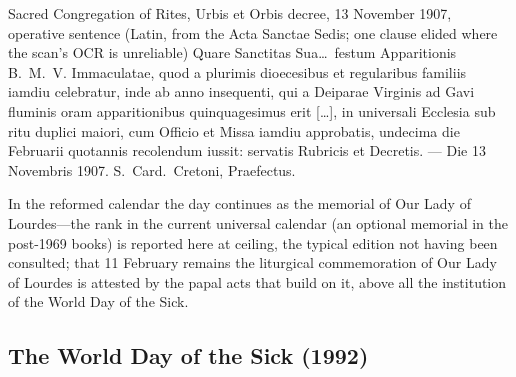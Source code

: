 \begin{operativetext}{Sacred Congregation of Rites, Urbis et
Orbis decree, 13 November 1907, operative sentence (Latin, from
the Acta Sanctae Sedis; one clause elided where the scan's OCR is
unreliable)}
Quare Sanctitas Sua\ldots\ festum Apparitionis B.~M.~V.
Immaculatae, quod a plurimis dioecesibus et regularibus familiis
iamdiu celebratur, inde ab anno insequenti, qui a Deiparae
Virginis ad Gavi fluminis oram apparitionibus quinquagesimus erit
[\ldots], in universali Ecclesia sub ritu duplici maiori, cum
Officio et Missa iamdiu approbatis, undecima die Februarii
quotannis recolendum iussit: servatis Rubricis et Decretis.
--- Die 13 Novembris 1907. S.~Card.~Cretoni,
Praefectus.
\end{operativetext} In the reformed calendar the day continues as the
memorial of Our Lady of Lourdes---the rank in the current
universal calendar (an optional memorial in the post-1969 books)
is reported here at ceiling, the typical edition not having been
consulted; that 11 February remains the liturgical commemoration
of Our Lady of Lourdes is attested by the papal acts that build
on it, above all the institution of the World Day of the
Sick.

\subsection{The World Day of the Sick (1992)}

